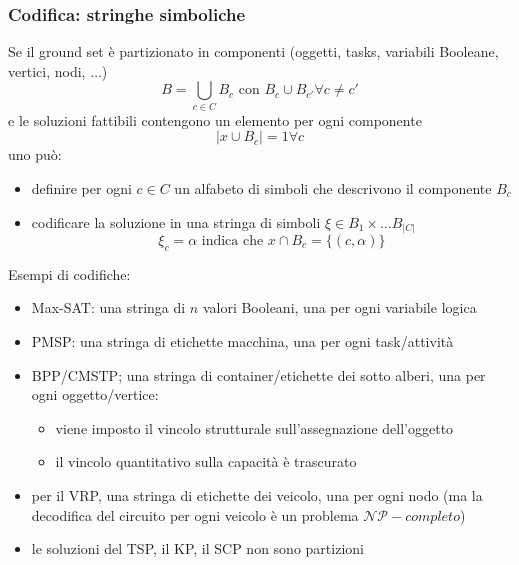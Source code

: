 \documentclass{article}
\begin{document}
\subsubsection{Codifica: stringhe simboliche}
Se il ground set è partizionato in componenti (oggetti, tasks, variabili Booleane, vertici, nodi, $\dots$)
$$B=\bigcup_{c\in C}B_c\text{ con }B_c\cup B_{c'}\forall c\neq c'$$
e le soluzioni fattibili contengono un elemento per ogni componente
$$|x\cup B_c|=1\forall c$$
uno può:
\begin{itemize}
    \item definire per ogni $c\in C$ un alfabeto di simboli che descrivono il componente $B_c$
    \item codificare la soluzione in una stringa di simboli $\xi\in B_1\times\dots B_{|C|}$
    $$\xi_c=\alpha\text{ indica che }x\cap B_c=\{(c,\alpha)\}$$
\end{itemize}
Esempi di codifiche:
\begin{itemize}
    \item Max-SAT: una stringa di $n$ valori Booleani, una per ogni variabile logica
    \item PMSP: una stringa di etichette macchina, una per ogni task/attività
    \item BPP/CMSTP; una stringa di container/etichette dei sotto alberi, una per ogni oggetto/vertice:
    \begin{itemize}
        \item viene imposto il vincolo strutturale sull'assegnazione dell'oggetto
        \item il vincolo quantitativo sulla capacità è trascurato
    \end{itemize}
    \item per il VRP, una stringa di etichette dei veicolo, una per ogni nodo (ma la decodifica
    del circuito per ogni veicolo è un problema $\mathcal{NP}-completo$)
    \item le soluzioni del TSP, il KP, il SCP non sono partizioni
\end{itemize}
\end{document}
